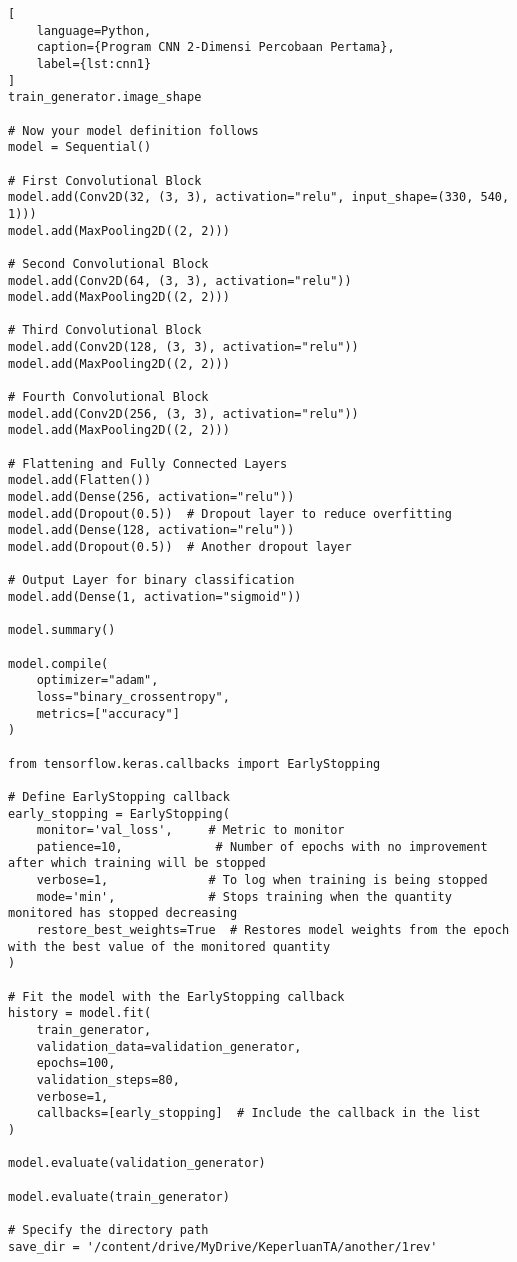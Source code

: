 \begin{lstlisting}[
    language=Python,
    caption={Program CNN 2-Dimensi Percobaan Pertama},
    label={lst:cnn1}
]
train_generator.image_shape

# Now your model definition follows
model = Sequential()

# First Convolutional Block
model.add(Conv2D(32, (3, 3), activation="relu", input_shape=(330, 540, 1)))
model.add(MaxPooling2D((2, 2)))

# Second Convolutional Block
model.add(Conv2D(64, (3, 3), activation="relu"))
model.add(MaxPooling2D((2, 2)))

# Third Convolutional Block
model.add(Conv2D(128, (3, 3), activation="relu"))
model.add(MaxPooling2D((2, 2)))

# Fourth Convolutional Block
model.add(Conv2D(256, (3, 3), activation="relu"))
model.add(MaxPooling2D((2, 2)))

# Flattening and Fully Connected Layers
model.add(Flatten())
model.add(Dense(256, activation="relu"))
model.add(Dropout(0.5))  # Dropout layer to reduce overfitting
model.add(Dense(128, activation="relu"))
model.add(Dropout(0.5))  # Another dropout layer

# Output Layer for binary classification
model.add(Dense(1, activation="sigmoid"))

model.summary()

model.compile(
    optimizer="adam",
    loss="binary_crossentropy",
    metrics=["accuracy"]
)

from tensorflow.keras.callbacks import EarlyStopping

# Define EarlyStopping callback
early_stopping = EarlyStopping(
    monitor='val_loss',     # Metric to monitor
    patience=10,             # Number of epochs with no improvement after which training will be stopped
    verbose=1,              # To log when training is being stopped
    mode='min',             # Stops training when the quantity monitored has stopped decreasing
    restore_best_weights=True  # Restores model weights from the epoch with the best value of the monitored quantity
)

# Fit the model with the EarlyStopping callback
history = model.fit(
    train_generator,
    validation_data=validation_generator,
    epochs=100,
    validation_steps=80,
    verbose=1,
    callbacks=[early_stopping]  # Include the callback in the list
)

model.evaluate(validation_generator)

model.evaluate(train_generator)

# Specify the directory path
save_dir = '/content/drive/MyDrive/KeperluanTA/another/1rev'


\end{lstlisting}
